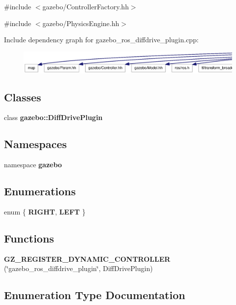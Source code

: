 {\ttfamily \#include $<$gazebo/ControllerFactory.hh$>$}\par
{\ttfamily \#include $<$gazebo/PhysicsEngine.hh$>$}\par
Include dependency graph for gazebo\_\-ros\_\-diffdrive\_\-plugin.cpp:
\nopagebreak
\begin{figure}[H]
\begin{center}
\leavevmode
\includegraphics[width=400pt]{gazebo__ros__diffdrive__plugin_8cpp__incl}
\end{center}
\end{figure}
\subsection*{Classes}
\begin{DoxyCompactItemize}
\item 
class {\bf gazebo::DiffDrivePlugin}
\end{DoxyCompactItemize}
\subsection*{Namespaces}
\begin{DoxyCompactItemize}
\item 
namespace {\bf gazebo}
\end{DoxyCompactItemize}
\subsection*{Enumerations}
\begin{DoxyCompactItemize}
\item 
enum \{ {\bf RIGHT}, 
{\bf LEFT}
 \}
\end{DoxyCompactItemize}
\subsection*{Functions}
\begin{DoxyCompactItemize}
\item 
{\bf GZ\_\-REGISTER\_\-DYNAMIC\_\-CONTROLLER} (\char`\"{}gazebo\_\-ros\_\-diffdrive\_\-plugin\char`\"{}, DiffDrivePlugin)
\end{DoxyCompactItemize}


\subsection{Enumeration Type Documentation}
